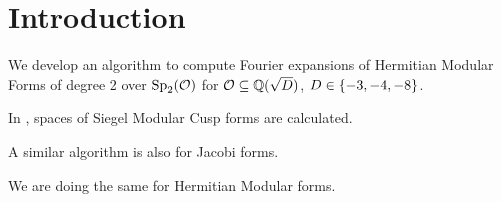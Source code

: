 
\section{Introduction}

We develop an algorithm to compute Fourier expansions of Hermitian Modular Forms of degree 2 over $\operatorname{Sp}_2(\mathcal{O})$ for $\mathcal{O} \subseteq \mathbb{Q}(\sqrt{D})$, $D \in \Set{-3,-4,-8}$.

In \cite{PoorYuen07Comp}, spaces of Siegel Modular Cusp forms are calculated.

A similar algorithm is also \cite[Algorithm 4.3]{Raum12Jacobi} for Jacobi forms.

We are doing the same for Hermitian Modular forms.
